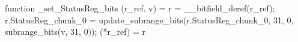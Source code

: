 function _set_StatusReg_bits (r_ref, v) = {
    r = __bitfield_deref(r_ref);
    r.StatusReg_chunk_0 = update_subrange_bits(r.StatusReg_chunk_0, 31, 0, subrange_bits(v, 31, 0));
    (*r_ref) = r
}
